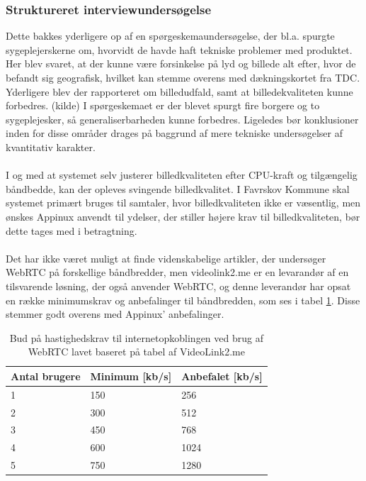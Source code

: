 \subsubsection{Struktureret interviewundersøgelse}
Dette bakkes yderligere op af en spørgeskemaundersøgelse, der bl.a. spurgte sygeplejerskerne om, hvorvidt de havde haft tekniske problemer med produktet. Her blev svaret, at der kunne være forsinkelse på lyd og billede alt efter, hvor de befandt sig geografisk, hvilket kan stemme overens med dækningskortet fra TDC.\\Yderligere blev der rapporteret om billedudfald, samt at billedekvaliteten kunne forbedres. (kilde) I spørgeskemaet er der blevet spurgt fire borgere og to sygeplejesker, så generaliserbarheden kunne forbedres. Ligeledes bør konklusioner inden for disse områder drages på baggrund af mere tekniske undersøgelser af kvantitativ karakter.\\ \\
I og med at systemet selv justerer billedkvaliteten efter CPU-kraft og tilgængelig båndbedde, kan der opleves svingende billedkvalitet. I Favrskov Kommune skal systemet primært bruges til samtaler, hvor billedkvaliteten ikke er væsentlig, men ønskes Appinux anvendt til ydelser, der stiller højere krav til billedkvaliteten, bør dette tages med i betragtning.
\\ \\
Det har ikke været muligt at finde videnskabelige artikler, der undersøger WebRTC på forskellige båndbredder, men videolink2.me er en levarandør af en tilsvarende løsning, der også anvender WebRTC, og denne leverandør har opsat en række minimumskrav og anbefalinger til båndbredden, som ses i tabel \ref{tab:hastighedtabel}. Disse stemmer godt overens med Appinux' anbefalinger.
\begin{table}[H]
\caption{Bud på hastighedskrav til internetopkoblingen ved brug af WebRTC lavet baseret på tabel af VideoLink2.me \parencite{videolink2me}}
\label{tab:hastighedtabel}
\centering
\begin{tabular}{|l|l|l|}
\hline
\cellcolor{blue!25}\textbf{Antal brugere} & \cellcolor{blue!25}\textbf{Minimum} [kb/s]  & \cellcolor{blue!25}\textbf{Anbefalet}  [kb/s] \\ \hline
1             & 150          & 256          \\ \hline
2             & 300          & 512          \\ \hline
3             & 450          & 768          \\ \hline
4             & 600          & 1024          \\ \hline
5             & 750          & 1280          \\ \hline
\end{tabular}

\end{table}
